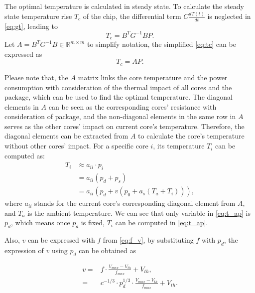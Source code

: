 The optimal temperature is calculated in steady state. To calculate the steady state temperature rise $T_{c}$ of the chip, the differential term $C\frac{dT(t)}{dt}$ is neglected in 
\eqref{eq:gt}, leading to
\begin{equation}\label{eq:tc}
T_{c} = B^{T}G^{-1}BP.
\end{equation}
Let $A = B^{T}G^{-1}B \in \mathbb{R}^{m \times m}$ to simplify notation, the simplified 
\eqref{eq:tc} can be expressed as
\begin{equation}\label{sim_tc}
T_{c} = AP.
\end{equation}

Please note that, the $A$ matrix links the core temperature and the power consumption with consideration of the thermal impact of all cores and the package, which can be used to find the optimal temperature. The diagonal elements in $A$ can be seen as the corresponding cores' resistance with consideration of package, and the non-diagonal elements in the same row in $A$ serves as the other cores' impact on current core's temperature. Therefore, the diagonal elements can be extracted from $A$ to calculate the core's temperature without other cores' impact. For a specific core $i$, its temperature $T_{i}$ can be computed as:
\begin{equation}\label{eq:t_ap}
\begin{split}
T_{i}&\approx a_{ii} \cdot p_{i}\\
&=a_{ii}(p_{d}+p_{s})\\
&=a_{ii}(p_{d}+v (p_{0}+a_{s}(T_{a}+T_{i}))),
\end{split}
\end{equation}
where $a_{ii}$ stands for the current core's corresponding diagonal element from $A$, and $T_{a}$ is the ambient temperature. We can see that only variable in \eqref{eq:t_ap} is $p_{d}$, which means once $p_{d}$ is fixed, $T_{i}$ can be computed in \eqref{eq:t_ap}.

Also, $v$ can be expressed with $f$ from \eqref{eq:f_v}, by substituting $f$ with $p_{d}$, the expression of $v$ using $p_{d}$ can be obtained as

\begin{equation}\label{eq:v_pd}
\begin{split}
v = &f\cdot \frac{V_{max}-V_{th}}{f_{max}}+V_{th},\\
=&c^{-1/3} \cdot p_{d}^{1/3}\cdot \frac{V_{max}-V_{th}}{f_{max}}+V_{th}.
\end{split}
\end{equation}

